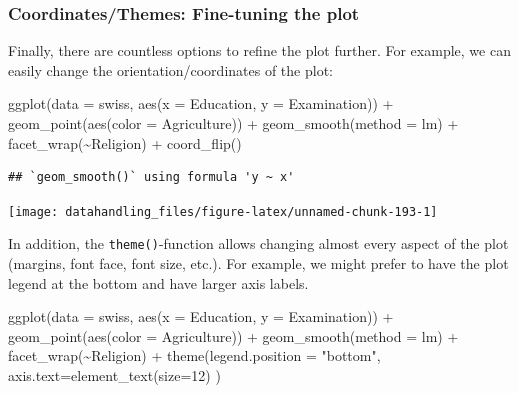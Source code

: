 \documentclass[
  12pt,
]{style/krantz}
\newenvironment{Shaded}{\begin{snugshade}}{\end{snugshade}}
\newcommand{\AttributeTok}[1]{\textcolor[rgb]{0.77,0.63,0.00}{#1}}
\newcommand{\DecValTok}[1]{\textcolor[rgb]{0.00,0.00,0.81}{#1}}
\newcommand{\FunctionTok}[1]{\textcolor[rgb]{0.00,0.00,0.00}{#1}}
\newcommand{\NormalTok}[1]{#1}
\newcommand{\SpecialCharTok}[1]{\textcolor[rgb]{0.00,0.00,0.00}{#1}}
\newcommand{\StringTok}[1]{\textcolor[rgb]{0.31,0.60,0.02}{#1}}
\begin{document}
\hypertarget{coordinatesthemes-fine-tuning-the-plot}{%
\subsubsection{Coordinates/Themes: Fine-tuning the plot}\label{coordinatesthemes-fine-tuning-the-plot}}

Finally, there are countless options to refine the plot further. For example, we can easily change the orientation/coordinates of the plot:

\begin{Shaded}
\begin{Highlighting}[]
\FunctionTok{ggplot}\NormalTok{(}\AttributeTok{data =}\NormalTok{ swiss, }\FunctionTok{aes}\NormalTok{(}\AttributeTok{x =}\NormalTok{ Education, }\AttributeTok{y =}\NormalTok{ Examination)) }\SpecialCharTok{+}
     \FunctionTok{geom\_point}\NormalTok{(}\FunctionTok{aes}\NormalTok{(}\AttributeTok{color =}\NormalTok{ Agriculture)) }\SpecialCharTok{+}
     \FunctionTok{geom\_smooth}\NormalTok{(}\AttributeTok{method =} \StringTok{\textquotesingle{}lm\textquotesingle{}}\NormalTok{) }\SpecialCharTok{+}
     \FunctionTok{facet\_wrap}\NormalTok{(}\SpecialCharTok{\textasciitilde{}}\NormalTok{Religion) }\SpecialCharTok{+}
     \FunctionTok{coord\_flip}\NormalTok{()}
\end{Highlighting}
\end{Shaded}

\begin{verbatim}
## `geom_smooth()` using formula 'y ~ x'
\end{verbatim}

\texttt{[image: datahandling\_files/figure-latex/unnamed-chunk-193-1]}

In addition, the \texttt{theme()}-function allows changing almost every aspect of the plot (margins, font face, font size, etc.). For example, we might prefer to have the plot legend at the bottom and have larger axis labels.

\begin{Shaded}
\begin{Highlighting}[]
\FunctionTok{ggplot}\NormalTok{(}\AttributeTok{data =}\NormalTok{ swiss, }\FunctionTok{aes}\NormalTok{(}\AttributeTok{x =}\NormalTok{ Education, }\AttributeTok{y =}\NormalTok{ Examination)) }\SpecialCharTok{+}
     \FunctionTok{geom\_point}\NormalTok{(}\FunctionTok{aes}\NormalTok{(}\AttributeTok{color =}\NormalTok{ Agriculture)) }\SpecialCharTok{+}
     \FunctionTok{geom\_smooth}\NormalTok{(}\AttributeTok{method =} \StringTok{\textquotesingle{}lm\textquotesingle{}}\NormalTok{) }\SpecialCharTok{+}
     \FunctionTok{facet\_wrap}\NormalTok{(}\SpecialCharTok{\textasciitilde{}}\NormalTok{Religion) }\SpecialCharTok{+}
     \FunctionTok{theme}\NormalTok{(}\AttributeTok{legend.position =} \StringTok{"bottom"}\NormalTok{, }\AttributeTok{axis.text=}\FunctionTok{element\_text}\NormalTok{(}\AttributeTok{size=}\DecValTok{12}\NormalTok{) )}
\end{Highlighting}
\end{Shaded}
\end{document}
